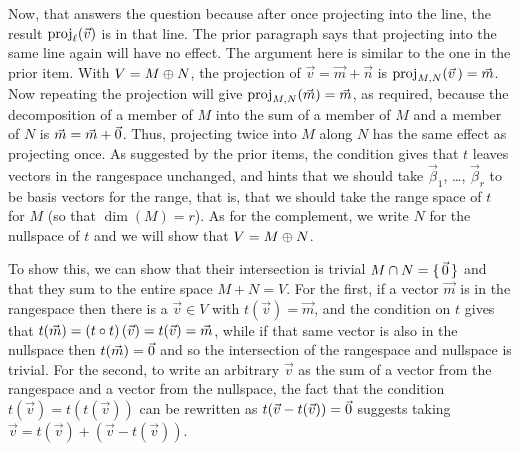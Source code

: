 \begin{exercises}
\begin{answer}
\begin{exparts}
          Now, that answers the question because after once projecting into
          the line, the result $\proj{\vec{v}}{\ell}$ is in that line.
          The prior paragraph says that projecting into the same line again 
          will have no effect.  
        \partsitem The argument here is similar to the one in the prior item.
          With $V=M\directsum N$, the projection of $\vec{v}=\vec{m}+\vec{n}$
          is $\proj{\vec{v}\,}{M,N}=\vec{m}$.
          Now repeating the projection will give $\proj{\vec{m}}{M,N}=\vec{m}$,
          as required, because the decomposition of a member of $M$ into the
          sum of a member of $M$ and a member of $N$ is 
          $\vec{m}=\vec{m}+\zero$.
          Thus, projecting twice into $M$ along $N$ has the same effect as 
          projecting once.
        \partsitem As suggested by the prior items, the condition
          gives that $t$ leaves vectors in the rangespace unchanged,
          and hints that we should take 
          $\vec{\beta}_1$, \ldots, $\vec{\beta}_r$
          to be basis vectors for the range, that is, that we should take
          the range space of $t$ for $M$ (so that $\dim(M)=r$).
          As for the complement, we write $N$ for the nullspace of $t$
          and we will show that $V=M\directsum N$.

          To show this, we can show that their intersection
          is trivial $M\intersection N=\set{\zero}$ and that they sum to 
          the entire space $M+N=V$.
          For the first, if a vector $\vec{m}$ is in the rangespace
          then there is a $\vec{v}\in V$ with $t(\vec{v})=\vec{m}$,
          and the condition on $t$ gives that 
          $t(\vec{m})=(\composed{t}{t})\,(\vec{v})=t(\vec{v})=\vec{m}$, while
          if that same vector is also in the nullspace then $t(\vec{m})=\zero$
          and so the intersection of the rangespace and nullspace is trivial.
          For the second, to write an arbitrary $\vec{v}$ as the sum of
          a vector from the rangespace and a vector from the nullspace,
          the fact that the condition $t(\vec{v})=t(t(\vec{v}))$ can be 
          rewritten as $t(\vec{v}-t(\vec{v}))=\zero$ suggests taking
          $\vec{v}=t(\vec{v})+(\vec{v}-t(\vec{v}))$.
  

\end{exparts}
\end{answer}
\end{exercises}
